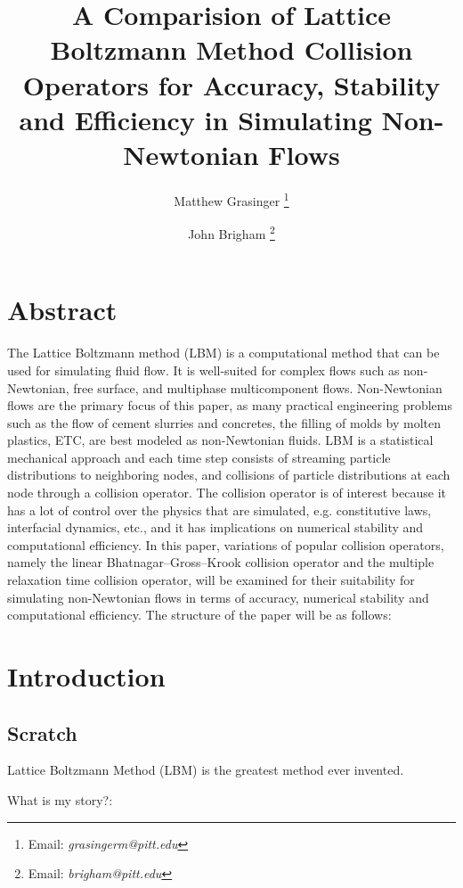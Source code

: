 \documentclass{article}
\title{A Comparision of Lattice Boltzmann Method Collision Operators for Accuracy, Stability and Efficiency in Simulating Non-Newtonian Flows}
\author{{Matthew Grasinger}
\thanks{Email: \textit{grasingerm@pitt.edu}}}
\author{John Brigham
\thanks{Email: \textit{brigham@pitt.edu}}}
\affil{Civil and Environmental Engineering Department, University of Pittsburgh}
\begin{document}
\maketitle
\newpage
\tableofcontents
\newpage
{}


\section*{Abstract}

The Lattice Boltzmann method (LBM) is a computational method that can be used for simulating fluid flow.
It is well-suited for complex flows such as non-Newtonian, free surface, and multiphase multicomponent flows.
Non-Newtonian flows are the primary focus of this paper, as many practical engineering problems such as the flow of cement slurries and concretes, the filling of molds by molten plastics, ETC, are best modeled as non-Newtonian fluids.
LBM is a statistical mechanical approach and each time step consists of streaming particle distributions to neighboring nodes, and collisions of particle distributions at each node through a collision operator.
The collision operator is of interest because it has a lot of control over the physics that are simulated, e.g. constitutive laws, interfacial dynamics, etc., and it has implications on numerical stability and computational efficiency.
In this paper, variations of popular collision operators, namely the linear Bhatnagar--Gross--Krook collision operator and the multiple relaxation time collision operator, will be examined for their suitability for simulating non-Newtonian flows in terms of accuracy, numerical stability and computational efficiency.
The structure of the paper will be as follows: 

\section{Introduction}

\subsection{Scratch}

Lattice Boltzmann Method (LBM) is the greatest method ever invented.

What is my story?:
\end{document}
